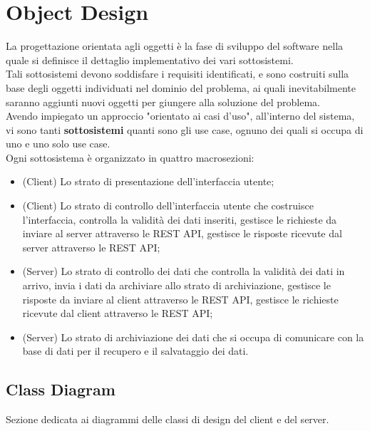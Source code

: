 \chapter{Object Design}
    La progettazione orientata agli oggetti è la fase di sviluppo del software nella quale si definisce il dettaglio implementativo dei vari sottosistemi. \\
    Tali sottosistemi devono soddisfare i requisiti identificati, e sono costruiti sulla base degli oggetti individuati nel dominio del problema, ai quali inevitabilmente saranno aggiunti nuovi oggetti per giungere alla soluzione del problema. \\
    Avendo impiegato un approccio "orientato ai casi d'uso", all'interno del sistema, vi sono tanti \textbf{sottosistemi} quanti sono gli use case, ognuno dei quali si occupa di uno e uno solo use case. \\
    Ogni sottosistema è organizzato in quattro macrosezioni:
    
    \begin{itemize}
        \item (Client) Lo strato di presentazione dell'interfaccia utente;
        \item (Client) Lo strato di controllo dell'interfaccia utente che costruisce l'interfaccia, controlla la validità dei dati inseriti, gestisce le richieste da inviare al server attraverso le REST API, gestisce le risposte ricevute dal server attraverso le REST API;
        \item (Server) Lo strato di controllo dei dati che controlla la validità dei dati in arrivo, invia i dati da archiviare allo strato di archiviazione, gestisce le risposte da inviare al client attraverso le REST API, gestisce le richieste ricevute dal client attraverso le REST API;
        \item (Server) Lo strato di archiviazione dei dati che si occupa di comunicare con la base di dati per il recupero e il salvataggio dei dati.
    \end{itemize}

    \clearpage

    \section{Class Diagram}
        Sezione dedicata ai diagrammi delle classi di design del client e del server.
    
